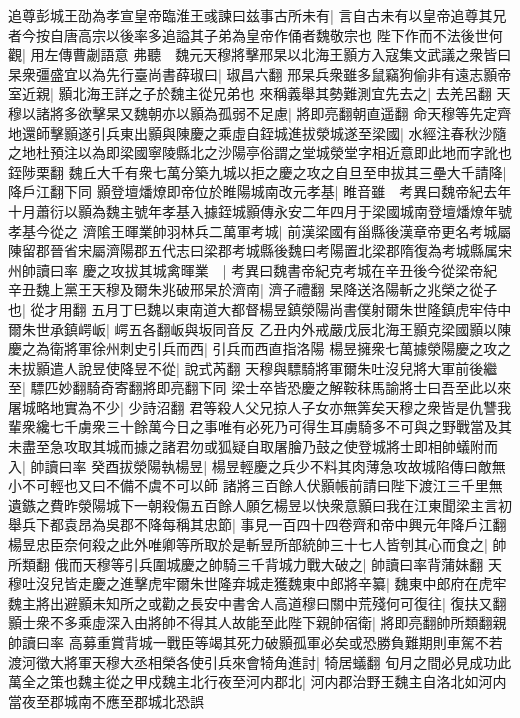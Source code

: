 追尊彭城王劭為孝宣皇帝臨淮王彧諫曰兹事古所未有|{
	言自古未有以皇帝追尊其兄者今按自唐高宗以後率多追謚其子弟為皇帝作俑者魏敬宗也}
陛下作而不法後世何觀|{
	用左傳曹劌語意}
弗聽　魏元天穆將擊邢杲以北海王顥方入寇集文武議之衆皆曰杲衆彊盛宜以為先行臺尚書薛琡曰|{
	琡昌六翻}
邢杲兵衆雖多鼠竊狗偷非有遠志顥帝室近親|{
	顥北海王詳之子於魏主從兄弟也}
來稱義舉其勢難測宜先去之|{
	去羌呂翻}
天穆以諸將多欲擊杲又魏朝亦以顥為孤弱不足慮|{
	將即亮翻朝直遥翻}
命天穆等先定齊地還師擊顥遂引兵東出顥與陳慶之乘虛自銍城進拔滎城遂至梁國|{
	水經注春秋沙隨之地杜預注以為即梁國寧陵縣北之沙陽亭俗謂之堂城滎堂字相近意即此地而字訛也銍陟栗翻}
魏丘大千有衆七萬分築九城以拒之慶之攻之自旦至申拔其三壘大千請降|{
	降戶江翻下同}
顥登壇燔燎即帝位於睢陽城南改元孝基|{
	睢音雖　考異曰魏帝紀去年十月蕭衍以顥為魏主號年孝基入據銍城顥傳永安二年四月于梁國城南登壇燔燎年號孝基今從之}
濟隂王暉業帥羽林兵二萬軍考城|{
	前漢梁國有甾縣後漢章帝更名考城屬陳留郡晉省宋屬濟陽郡五代志曰梁郡考城縣後魏曰考陽置北梁郡隋復為考城縣属宋州帥讀曰率}
慶之攻拔其城禽暉業　|{
	考異曰魏書帝紀克考城在辛丑後今從梁帝紀}
辛丑魏上黨王天穆及爾朱兆破邢杲於濟南|{
	濟子禮翻}
杲降送洛陽斬之兆榮之從子也|{
	從才用翻}
五月丁巳魏以東南道大都督楊昱鎮滎陽尚書僕射爾朱世隆鎮虎牢侍中爾朱世承鎮崿岅|{
	崿五各翻岅與坂同音反}
乙丑内外戒嚴戊辰北海王顥克梁國顥以陳慶之為衛將軍徐州刺史引兵而西|{
	引兵而西直指洛陽}
楊昱擁衆七萬據滎陽慶之攻之未拔顥遣人說昱使降昱不從|{
	說式芮翻}
天穆與驃騎將軍爾朱吐沒兒將大軍前後繼至|{
	驃匹妙翻騎奇寄翻將即亮翻下同}
梁士卒皆恐慶之解鞍秣馬諭將士曰吾至此以來屠城略地實為不少|{
	少詩沼翻}
君等殺人父兄掠人子女亦無筭矣天穆之衆皆是仇讐我輩衆纔七千虜衆三十餘萬今日之事唯有必死乃可得生耳虜騎多不可與之野戰當及其未盡至急攻取其城而據之諸君勿或狐疑自取屠膾乃鼓之使登城將士即相帥蟻附而入|{
	帥讀曰率}
癸酉拔滎陽執楊昱|{
	楊昱輕慶之兵少不料其肉薄急攻故城陷傳曰敵無小不可輕也又曰不備不虞不可以師}
諸將三百餘人伏顥帳前請曰陛下渡江三千里無遺鏃之費昨滎陽城下一朝殺傷五百餘人願乞楊昱以快衆意顥曰我在江東聞梁主言初舉兵下都袁昂為吳郡不降每稱其忠節|{
	事見一百四十四卷齊和帝中興元年降戶江翻}
楊昱忠臣奈何殺之此外唯卿等所取於是斬昱所部統帥三十七人皆刳其心而食之|{
	帥所類翻}
俄而天穆等引兵圍城慶之帥騎三千背城力戰大破之|{
	帥讀曰率背蒲妹翻}
天穆吐沒兒皆走慶之進擊虎牢爾朱世隆弃城走獲魏東中郎將辛纂|{
	魏東中郎府在虎牢}
魏主將出避顥未知所之或勸之長安中書舍人高道穆曰關中荒殘何可復往|{
	復扶又翻}
顥士衆不多乘虛深入由將帥不得其人故能至此陛下親帥宿衛|{
	將即亮翻帥所類翻親帥讀曰率}
高募重賞背城一戰臣等竭其死力破顥孤軍必矣或恐勝負難期則車駕不若渡河徵大將軍天穆大丞相榮各使引兵來會犄角進討|{
	犄居蟻翻}
旬月之間必見成功此萬全之策也魏主從之甲戍魏主北行夜至河内郡北|{
	河内郡治野王魏主自洛北如河内當夜至郡城南不應至郡城北恐誤}
